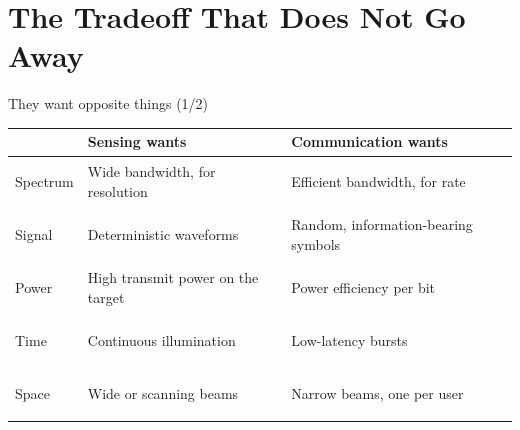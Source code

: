 
\section[Tradeoff]{The Tradeoff That Does Not Go Away}


\begin{frame}{They want opposite things (1/2)}
  \vspace{0.2em}
  \scriptsize
  \setlength{\tabcolsep}{4pt}
  \renewcommand{\arraystretch}{1.35}
  \begin{tabularx}{\textwidth}{>{\bfseries\raggedright\arraybackslash}p{1.55cm}
      >{\raggedright\arraybackslash}X >{\raggedright\arraybackslash}X}
    \toprule
    & \textcolor{coreorange}{\textbf{Sensing wants}} & \textcolor{ranblue}{\textbf{Communication wants}} \\
    \midrule
    Spectrum   & Wide bandwidth, for resolution & Efficient bandwidth, for rate \\
    Signal     & Deterministic waveforms & Random, information-bearing symbols \\
    Power      & High transmit power on the target & Power efficiency per bit \\
    Time       & Continuous illumination & Low-latency bursts \\
    Space      & Wide or scanning beams & Narrow beams, one per user \\
    \bottomrule
  \end{tabularx}

  \vspace{0.6em}
\end{frame}


